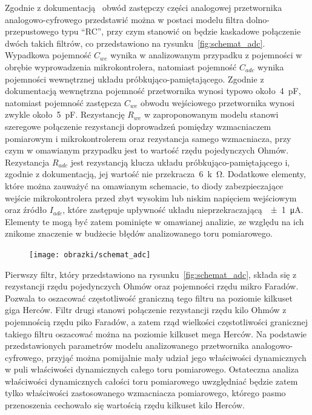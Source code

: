 Zgodnie z dokumentacją~\cite{stm_f411} obwód zastępczy części analogowej przetwornika analogowo-cyfrowego przedstawić można w postaci modelu filtra dolno-przepustowego typu \enquote{RC}, przy czym stanowić on będzie kaskadowe połączenie dwóch takich filtrów, co przedstawiono na rysunku~\ref{fig:schemat_adc}. Wypadkowa pojemność $C_{we}$ wynika w analizowanym przypadku z pojemności w obrębie wyprowadzenia mikrokontrolera, natomiast pojemność $C_{adc}$ wynika pojemności wewnętrznej układu próbkująco-pamiętającego. Zgodnie z dokumentacją wewnętrzna pojemność przetwornika wynosi typowo około~\qty{4}{pF}, natomiast pojemność zastępcza $C_{we}$ obwodu wejściowego przetwornika wynosi zwykle około~\qty{5}{pF}. Rezystancję $R_{we}$ w zaproponowanym modelu stanowi szeregowe połączenie rezystancji doprowadzeń pomiędzy wzmacniaczem pomiarowym i mikrokontrolerem oraz rezystancja samego wzmacniacza, przy czym w omawianym przypadku jest to wartość rzędu pojedynczych Ohmów. Rezystancja $R_{adc}$ jest rezystancją klucza układu próbkująco-pamiętającego i, zgodnie z dokumentacją, jej wartość nie przekracza~\qty{6}{k\ohm}. Dodatkowe elementy, które można zauważyć na omawianym schemacie, to diody zabezpieczające wejście mikrokontrolera przed zbyt wysokim lub niskim napięciem wejściowym oraz źródło $I_{adc}$, które zastępuje upływność układu nieprzekraczającą~\qty{\pm 1}{\micro A}. Elementy te mogą być zatem pominięte w omawianej analizie, ze względu na ich znikome znaczenie w budżecie błędów analizowanego toru pomiarowego.

\begin{figure}[htb!]
\begin{center}
\texttt{[image: obrazki/schemat\_adc]}
\end{center}
\end{figure}

Pierwszy filtr, który przedstawiono na rysunku~\ref{fig:schemat_adc}, składa się z rezystancji rzędu pojedynczych Ohmów oraz pojemności rzędu mikro Faradów. Pozwala to oszacować częstotliwość graniczną tego filtru na poziomie kilkuset giga Herców. Filtr drugi stanowi połączenie rezystancji rzędu kilo Ohmów z pojemnością rzędu piko Faradów, a zatem rząd wielkości częstotliwości granicznej takiego filtru oszacować można na poziomie kilkuset mega Herców. Na podstawie przedstawionych parametrów modelu analizowanego przetwornika analogowo-cyfrowego, przyjąć można pomijalnie mały udział jego właściwości dynamicznych w puli właściwości dynamicznych całego toru pomiarowego. Ostateczna analiza właściwości dynamicznych całości toru pomiarowego uwzględniać będzie zatem tylko właściwości zastosowanego wzmacniacza pomiarowego, którego pasmo przenoszenia cechowało się wartością rzędu kilkuset kilo Herców.

